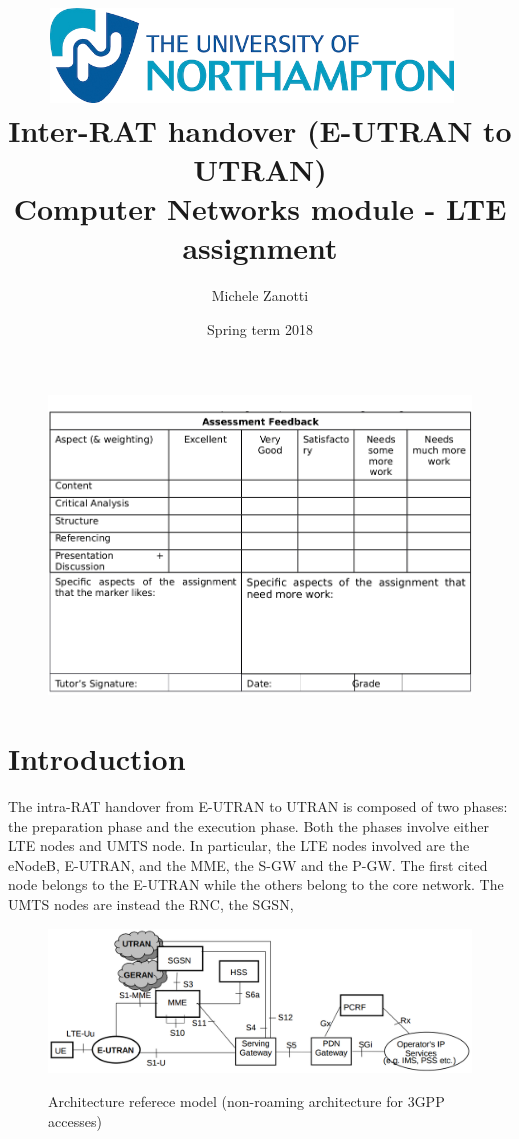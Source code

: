 \documentclass[12pt, a4paper]{article}
\title{
  \includegraphics[width=0.8\textwidth]{img/logo.png}~ \\
  Inter-RAT handover (E-UTRAN to UTRAN) \\ \large Computer Networks module - LTE assignment
}
\author{Michele Zanotti}
\date{Spring term 2018}
\begin{document}
\maketitle
\begin{figure}[htb]
	\centering
	\includegraphics[width=1\linewidth]{img/valuation-table.png}
\end{figure}

\newpage

\section{Introduction}
The intra-RAT handover from E-UTRAN to UTRAN is composed of two phases: the
preparation phase and the execution phase. Both the phases involve either LTE
nodes and UMTS node. In particular, the LTE nodes involved are the eNodeB,
E-UTRAN, and the MME, the S-GW and the P-GW. The first cited node belongs to
the E-UTRAN while the others belong to the core network. The UMTS nodes are instead
the RNC, the SGSN,

\begin{figure}[htb]
	\centering
	\includegraphics[width=1\linewidth]{img/architecture-reference.png}
	\label{fig:architecture-model}
	\caption{Architecture referece model (non-roaming architecture for 3GPP accesses)}
\end{figure}






\begin{thebibliography}{99}
  \footnotesize


\end{thebibliography}
\end{document}
